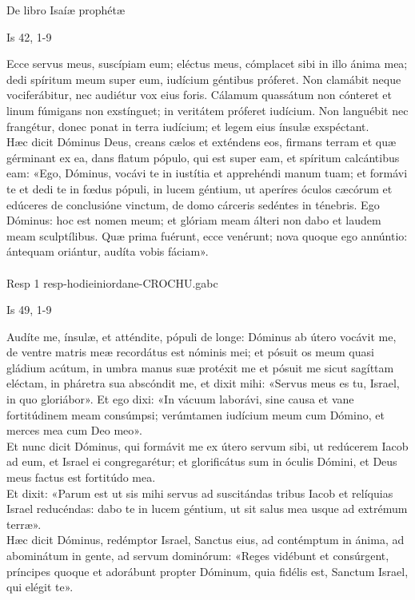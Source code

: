 \documentclass[options]{article}
\begin{document}
	De libro Isaíæ prophétæ 
	\begin{flushright}
		Is 42, 1-9
	\end{flushright}
	Ecce servus meus, suscípiam eum; eléctus meus, cómplacet sibi in illo ánima mea; dedi spíritum meum super eum, iudícium géntibus próferet. Non clamábit neque vociferábitur, nec audiétur vox eius foris. Cálamum quassátum non cónteret et linum fúmigans non exstínguet; in veritátem próferet iudícium. Non languébit nec frangétur, donec ponat in terra iudícium; et legem eius ínsulæ exspéctant.\\
	Hæc dicit Dóminus Deus, creans cælos et exténdens eos, firmans terram et quæ gérminant ex ea, dans flatum pópulo, qui est super eam, et spíritum calcántibus eam: «Ego, Dóminus, vocávi te in iustítia et apprehéndi manum tuam; et formávi te et dedi te in fœdus pópuli, in lucem géntium, ut aperíres óculos cæcórum et edúceres de conclusióne vinctum, de domo cárceris sedéntes in ténebris. Ego Dóminus: hoc est nomen meum; et glóriam meam álteri non dabo et laudem meam sculptílibus. Quæ prima fuérunt, ecce venérunt; nova quoque ego annúntio: ántequam oriántur, audíta vobis fáciam».\\
	\\
	Resp 1 resp-hodieiniordane-CROCHU.gabc\\
	\begin{flushright}
		Is 49, 1-9	
	\end{flushright}
	Audíte me, ínsulæ, et atténdite, pópuli de longe: Dóminus ab útero vocávit me, de ventre matris meæ recordátus est nóminis mei; et pósuit os meum quasi gládium acútum, in umbra manus suæ protéxit me et pósuit me sicut sagíttam eléctam, in pháretra sua abscóndit me, et dixit mihi: «Servus meus es tu, Israel, in quo gloriábor». Et ego dixi: «In vácuum laborávi, sine causa et vane fortitúdinem meam consúmpsi; verúmtamen iudícium meum cum Dómino, et merces mea cum Deo meo».\\
	Et nunc dicit Dóminus, qui formávit me ex útero servum sibi, ut redúcerem Iacob ad eum, et Israel ei congregarétur; et glorificátus sum in óculis Dómini, et Deus meus factus est fortitúdo mea.\\
	Et dixit: «Parum est ut sis mihi servus ad suscitándas tribus Iacob et relíquias Israel reducéndas: dabo te in lucem géntium, ut sit salus mea usque ad extrémum terræ».\\
	Hæc dicit Dóminus, redémptor Israel, Sanctus eius, ad contémptum in ánima, ad abominátum in gente, ad servum dominórum: «Reges vidébunt et consúrgent, príncipes quoque et adorábunt propter Dóminum, quia fidélis est, Sanctum Israel, qui elégit te».\\
\end{document}
